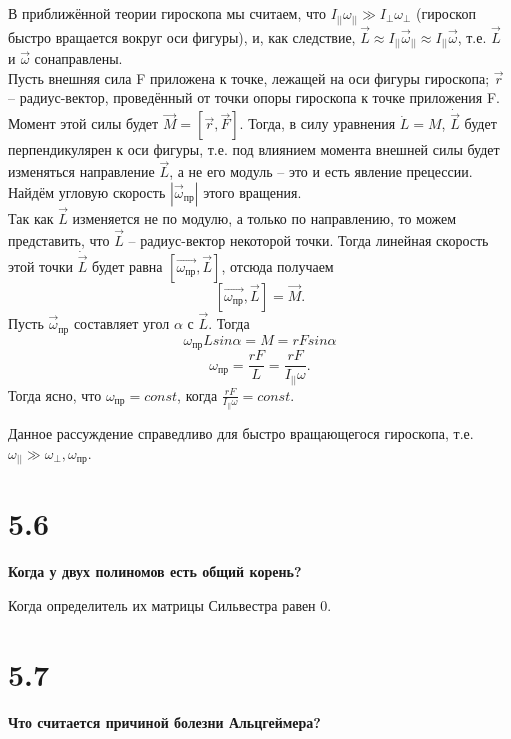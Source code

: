 \documentclass[a4paper,14pt]{article}
\begin{document}
В приближённой теории гироскопа мы считаем, что $I_{||} \omega_{||} \gg I_{\perp} \omega_{\perp}$ (гироскоп быстро вращается вокруг оси фигуры), и, как следствие, $\vec{L} \approx I_{||} \vec{\omega}_{||} \approx I_{||} \vec{\omega}$, т.е. $\vec{L}$ и $\vec{\omega}$ сонаправлены.
\\
Пусть внешняя сила F приложена к точке, лежащей на оси фигуры гироскопа; $\vec{r}$ -- радиус-вектор, проведённый от точки опоры гироскопа к точке приложения F. Момент этой силы будет $\vec{M} = [\vec{r},\vec{F}]$. Тогда, в силу уравнения $\dot L = M$, $\dot{\vec{L}}$ будет перпендикулярен к оси фигуры, т.е. под влиянием момента внешней силы будет изменяться направление $\vec{L}$, а не его модуль -- это и есть явление прецессии. Найдём угловую скорость $|\vec{\omega}_{\text{пр}}|$ этого вращения.
\\
Так как $\vec{L}$ изменяется не по модулю, а только по направлению, то можем представить, что $\vec{L}$ -- радиус-вектор некоторой точки. Тогда линейная скорость этой точки $\dot{\vec{L}}$ будет равна $[\vec{\omega_{\text{пр}}}, \vec{L}]$, отсюда получаем
$$
[\vec{\omega_{\text{пр}}}, \vec{L}] = \vec{M}.
$$
Пусть $\vec{\omega}_{\text{пр}}$ составляет угол $\alpha$ с $\vec{L}$. Тогда
$$
\omega_{\text{пр}} L sin \alpha = M = r F sin \alpha
$$
$$
\omega_{\text{пр}} = \frac{r F}{L} = \frac{r F}{I_{||} \omega}.
$$
Тогда ясно, что $\omega_{\text{пр}} = const$, когда $\frac{r F}{I_{||} \omega} = const$.

Данное рассуждение справедливо для быстро вращающегося гироскопа, т.е. $\omega_{||} \gg \omega_{\perp}, \omega_{\text{пр}}$.

\section*{5.6}

\begin{center}
	\LARGE{\textbf{Когда у двух полиномов есть общий корень?}}\\
\end{center}

Когда определитель их матрицы Сильвестра равен 0.

\section*{5.7}

\begin{center}
	\LARGE{\textbf{Что считается причиной болезни Альцгеймера?}}\\
\end{center}
\end{document}
